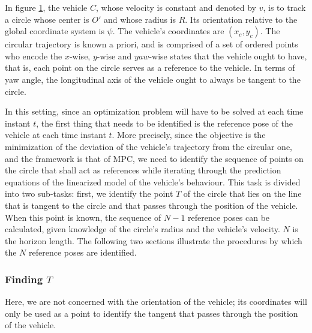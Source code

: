In figure \ref{fig:circular_mpc}, the vehicle $C$, whose velocity is constant
and denoted by $v$, is to track a circle whose center is $O'$ and whose
radius is $R$. Its orientation relative to the global coordinate system is
$\psi$. The vehicle's coordinates are $(x_c, y_c)$. The circular trajectory
is known a priori, and is comprised of a set of ordered points who encode
the $x$-wise, $y$-wise and $yaw$-wise states that the vehicle ought to have,
that is, each point on the circle serves as a reference to the vehicle. In terms
of yaw angle, the longitudinal axis of the vehicle ought to always be tangent
to the circle.


\begin{figure}[H]\centering
  \scalebox{0.8}{}
  \caption{}
  \label{fig:circular_mpc}
\end{figure}

In this setting, since an optimization problem will have to be solved at each
time instant $t$, the first thing that needs to be identified is the reference
pose of the vehicle at each time instant $t$. More precisely, since the
objective is the minimization of the deviation of the vehicle's trajectory
from the circular one, and the framework is that of MPC, we need to identify
the sequence of points on the circle that shall act as references while
iterating through the prediction equations of the linearized model of the
vehicle's behaviour. This task is divided into two sub-tasks: first, we
identify the point $T$ of the circle that lies on the line that is tangent to
the circle and that passes through the position of the vehicle. When this
point is known, the sequence of $N-1$ reference poses can be calculated,
given knowledge of the circle's radius and the vehicle's velocity. $N$ is the
horizon length. The following two sections illustrate the procedures by
which the $N$ reference poses are identified.

\subsubsection{Finding $T$}

Here, we are not concerned with the orientation of the vehicle; its coordinates
will only be used as a point to identify the tangent that passes through
the position of the vehicle.


\begin{figure}[H]\centering
  \scalebox{0.8}{}
  \caption{}
  \label{fig:circular_mpc_tan}
\end{figure}


